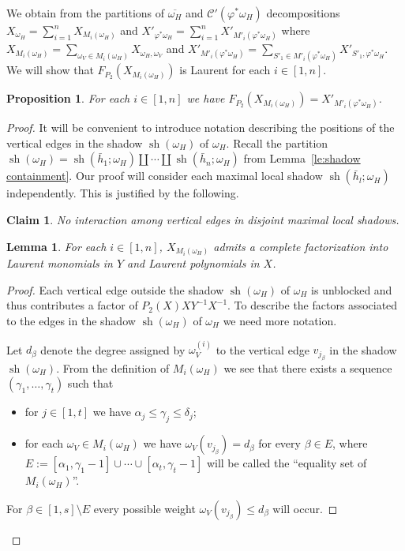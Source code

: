 \documentclass{amsart}
\newtheorem{claim}[theorem]{Claim}
\newtheorem{lemma}[theorem]{Lemma}
\newtheorem{proposition}[theorem]{Proposition}
\newcommand{\cC}{\mathcal{C}}
\newcommand{\sh}{\operatorname{sh}}
\begin{document}
 We obtain from the partitions of $\overline{\omega_H}$ and $\cC'(\varphi^*\omega_H)$ decompositions $X_{\omega_H}=\sum\limits_{i=1}^n X_{M_i(\omega_H)}$ and $X'_{\varphi^*\omega_H}=\sum\limits_{i=1}^n X'_{M'_i(\varphi^*\omega_H)}$ where $X_{M_i(\omega_H)}=\sum\limits_{\omega_V\in M_i(\omega_H)} X_{\omega_H,\omega_V}$ and $X'_{M'_i(\varphi^*\omega_H)}=\sum\limits_{S'_1\in M'_i(\varphi^*\omega_H)} X'_{S'_1,\varphi^*\omega_H}$.  We will show that $F_{P_2}(X_{M_i(\omega_H)})$ is Laurent for each $i\in[1,n]$.  
 \begin{proposition}
  For each $i\in[1,n]$ we have $F_{P_2}(X_{M_i(\omega_H)})=X'_{M'_i(\varphi^*\omega_H)}$.
 \end{proposition}
 \begin{proof}
  It will be convenient to introduce notation describing the positions of the vertical edges in the shadow $\sh(\omega_H)$ of $\omega_H$.  Recall the partition $\sh(\omega_H)=\sh(\bar h_1;\omega_H)\amalg\cdots\amalg\sh(\bar h_n;\omega_H)$ from Lemma~\ref{le:shadow containment}.  Our proof will consider each maximal local shadow $\sh(\bar h_l;\omega_H)$ independently.  This is justified by the following.
  \begin{claim}
   No interaction among vertical edges in disjoint maximal local shadows.
  \end{claim}


     
  \begin{lemma}\label{le:factorization}
   For each $i\in[1,n]$, $X_{M_i(\omega_H)}$ admits a complete factorization into Laurent monomials in $Y$ and Laurent polynomials in $X$.
  \end{lemma}
  \begin{proof}
   Each vertical edge outside the shadow $\sh(\omega_H)$ of $\omega_H$ is unblocked and thus contributes a factor of $P_2(X)XY^{-1}X^{-1}$.  To describe the factors associated to the edges in the shadow $\sh(\omega_H)$ of $\omega_H$ we need more notation.

   Let $d_\beta$ denote the degree assigned by $\omega_V^{(i)}$ to the vertical edge $v_{j_\beta}$ in the shadow $\sh(\omega_H)$.  From the definition of $M_i(\omega_H)$ we see that there exists a sequence $(\gamma_1,\ldots,\gamma_t)$ such that 
   \begin{itemize}
    \item for $j\in[1,t]$ we have $\alpha_j\le\gamma_j\le\delta_j$;
    \item for each $\omega_V\in M_i(\omega_H)$ we have $\omega_V(v_{j_\beta})=d_\beta$ for every $\beta\in E$, where $E:=[\alpha_1,\gamma_1-1]\cup\cdots\cup[\alpha_t,\gamma_t-1]$ will be called the ``equality set of $M_i(\omega_H)$''.
   \end{itemize}
   For $\beta\in[1,s]\setminus E$ every possible weight $\omega_V(v_{j_\beta})\le d_\beta$ will occur.


\end{proof}
\end{proof}
\end{document}

